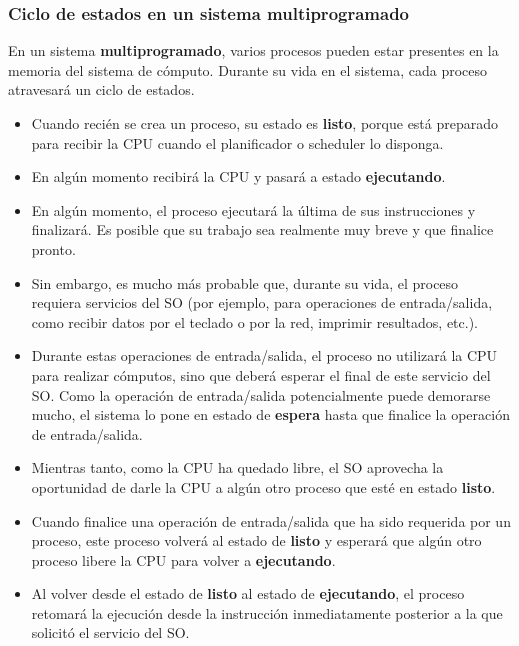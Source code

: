 \documentclass[spanish,A4,]{article}
\begin{document}
\subsubsection{Ciclo de estados en un sistema
multiprogramado}\label{ciclo-de-estados-en-un-sistema-multiprogramado}

En un sistema \textbf{multiprogramado}, varios procesos pueden estar
presentes en la memoria del sistema de cómputo. Durante su vida en el
sistema, cada proceso atravesará un ciclo de estados.

\begin{itemize}
\item
  Cuando recién se crea un proceso, su estado es \textbf{listo}, porque
  está preparado para recibir la CPU cuando el planificador o scheduler
  lo disponga.
\item
  En algún momento recibirá la CPU y pasará a estado
  \textbf{ejecutando}.
\item
  En algún momento, el proceso ejecutará la última de sus instrucciones
  y finalizará. Es posible que su trabajo sea realmente muy breve y que
  finalice pronto.
\item
  Sin embargo, es mucho más probable que, durante su vida, el proceso
  requiera servicios del SO (por ejemplo, para operaciones de
  entrada/salida, como recibir datos por el teclado o por la red,
  imprimir resultados, etc.).
\item
  Durante estas operaciones de entrada/salida, el proceso no utilizará
  la CPU para realizar cómputos, sino que deberá esperar el final de
  este servicio del SO. Como la operación de entrada/salida
  potencialmente puede demorarse mucho, el sistema lo pone en estado de
  \textbf{espera} hasta que finalice la operación de entrada/salida.
\item
  Mientras tanto, como la CPU ha quedado libre, el SO aprovecha la
  oportunidad de darle la CPU a algún otro proceso que esté en estado
  \textbf{listo}.
\item
  Cuando finalice una operación de entrada/salida que ha sido requerida
  por un proceso, este proceso volverá al estado de \textbf{listo} y
  esperará que algún otro proceso libere la CPU para volver a
  \textbf{ejecutando}.
\item
  Al volver desde el estado de \textbf{listo} al estado de
  \textbf{ejecutando}, el proceso retomará la ejecución desde la
  instrucción inmediatamente posterior a la que solicitó el servicio del
  SO.
\end{itemize}
\end{document}
